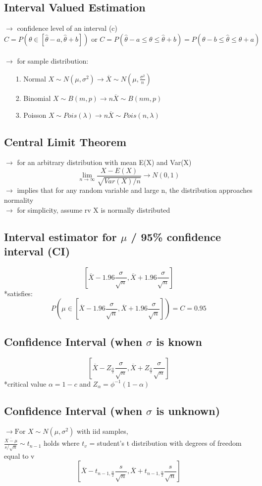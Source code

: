 \documentclass{article}
\begin{document}
\subsection{Interval Valued Estimation}
$\rightarrow$ confidence level of an interval (c)\\
\[C=P(\theta \in [\hat{\theta}-a,\hat{\theta}+b]) \text{ or } C=P(\hat{\theta}-a \leq \theta \leq \hat{\theta}+b) = P(\theta -b \leq \hat{\theta} \leq \theta+a)\]\\
$\rightarrow$ for sample distribution:
\begin{itemize}
    \item [1.] Normal $X\sim N(\mu,\sigma^2) \rightarrow \overline{X}\sim N(\mu,\frac{\sigma^2}{n})$
    \item[2.] Binomial $X\sim B(m,p) \rightarrow n\overline{X} \sim B(nm,p)$
    \item[3.] Poisson $X\sim Pois(\lambda) \rightarrow n\overline{X}\sim Pois(n,\lambda)$
\end{itemize}
\subsection{Central Limit Theorem}
$\rightarrow$ for an arbitrary distribution with mean E(X) and Var(X)\\
\[ \lim_{n\rightarrow \infty} \frac{X-E(X)}{\sqrt{Var(X)/n}} \rightarrow N(0,1)\]
$\rightarrow$ implies that for any random variable and large n, the distribution approaches normality\\
$\rightarrow$ for simplicity, assume rv X is normally distributed\\
\subsection{Interval estimator for $\mu$ / 95\% confidence interval (CI)}
\[[\overline{X}-1.96\frac{\sigma}{\sqrt{n}},\overline{X}+1.96\frac{\sigma}{\sqrt{n}}]\]
*satisfies: \[P(\mu \in [\overline{X}-1.96\frac{\sigma}{\sqrt{n}}, \overline{X}+1.96\frac{\sigma}{\sqrt{n}}])=C=0.95\]
\subsection{Confidence Interval (when $\sigma$ is known}
\[[\overline{X}-Z_\frac{\alpha}{2}\frac{\sigma}{\sqrt{n}},\overline{X}+Z_\frac{\alpha}{2}\frac{\sigma}{\sqrt{n}}]\]
*critical value $\alpha = 1-c$ and $Z_\alpha = \phi^{-1}(1-\alpha)$
\subsection{Confidence Interval (when $\sigma$ is unknown)}
$\rightarrow \text{For }X\sim N(\mu,\sigma^2)$ with iid samples,\\
$\frac{\overline{X-\mu}}{s/\sqrt{n}}\sim t_{n-1}$ holds where $t_v$ = student's t distribution with degrees of freedom equal to v\\
\[[\overline{X}-t_{n-1,\frac{\alpha}{2}}\frac{s}{\sqrt{n}},\overline{X}+t_{n-1,\frac{\alpha}{2}}\frac{s}{\sqrt{n}}]\]
\end{document}
